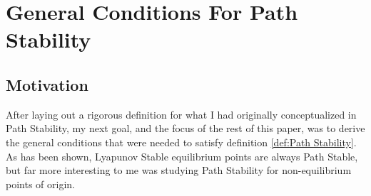 \documentclass{article}
\newcommand{\B}[1]{\boldsymbol{#1}}
\DeclarePairedDelimiter\norm{\lVert}{\rVert}%
\newtheorem{theorem}{Theorem}[section]
\theoremstyle{definition}
\theoremstyle{remark}
\begin{document}


\section{General Conditions For Path Stability}
\subsection{Motivation}
After laying out a rigorous definition for what I had originally conceptualized in Path Stability,
my next goal, and the focus of the rest of this paper, was to derive the general conditions
that were needed to satisfy definition \ref{def:Path Stability}. As has been shown, 
Lyapunov Stable equilibrium points are always Path Stable, but far more interesting to me 
was studying Path Stability for non-equilibrium points of origin. 
\end{document}
